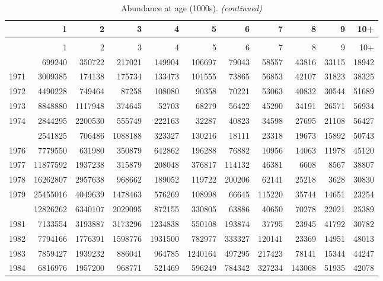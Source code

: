\documentclass[
]{article}
\begin{document}
\begin{longtable}[t]{lrrrrrrrrrr}
\caption{\label{tab:NAA-table}Abundance at age (1000s).}\\
\toprule
  & 1 & 2 & 3 & 4 & 5 & 6 & 7 & 8 & 9 & 10+\\
\midrule
\endfirsthead
\caption[]{Abundance at age (1000s). \textit{(continued)}}\\
\toprule
  & 1 & 2 & 3 & 4 & 5 & 6 & 7 & 8 & 9 & 10+\\
\midrule
\endhead

\endfoot
\bottomrule
\endlastfoot
1970 & 699240 & 350722 & 217021 & 149904 & 106697 & 79043 & 58557 & 43816 & 33115 & 18942\\
1971 & 3009385 & 174138 & 175734 & 133473 & 101555 & 73865 & 56853 & 42107 & 31823 & 38325\\
1972 & 4490228 & 749464 & 87258 & 108080 & 90358 & 70221 & 53063 & 40832 & 30544 & 51689\\
1973 & 8848880 & 1117948 & 374645 & 52703 & 68279 & 56422 & 45290 & 34191 & 26571 & 56934\\
1974 & 2844295 & 2200530 & 555749 & 222163 & 32287 & 40823 & 34598 & 27695 & 21108 & 56427\\
\addlinespace
1975 & 2541825 & 706486 & 1088188 & 323327 & 130216 & 18111 & 23318 & 19673 & 15892 & 50743\\
1976 & 7779550 & 631980 & 350879 & 642862 & 196288 & 76882 & 10956 & 14063 & 11978 & 45120\\
1977 & 11877592 & 1937238 & 315879 & 208048 & 376817 & 114132 & 46381 & 6608 & 8567 & 38807\\
1978 & 16262807 & 2957638 & 968662 & 189052 & 119722 & 200206 & 62141 & 25218 & 3628 & 30830\\
1979 & 25455016 & 4049639 & 1478463 & 576269 & 108998 & 66645 & 115220 & 35744 & 14651 & 23254\\
\addlinespace
1980 & 12826262 & 6340107 & 2029095 & 872155 & 330805 & 63886 & 40650 & 70278 & 22021 & 25389\\
1981 & 7133554 & 3193887 & 3173296 & 1234838 & 550108 & 193874 & 37795 & 23945 & 41792 & 30782\\
1982 & 7794166 & 1776391 & 1598776 & 1931500 & 782977 & 333327 & 120141 & 23369 & 14951 & 48013\\
1983 & 7859427 & 1939232 & 886041 & 964785 & 1240164 & 497295 & 217423 & 78141 & 15344 & 44247\\
1984 & 6816976 & 1957200 & 968771 & 521469 & 596249 & 784342 & 327234 & 143068 & 51935 & 42078\\

\end{longtable}
\end{document}
